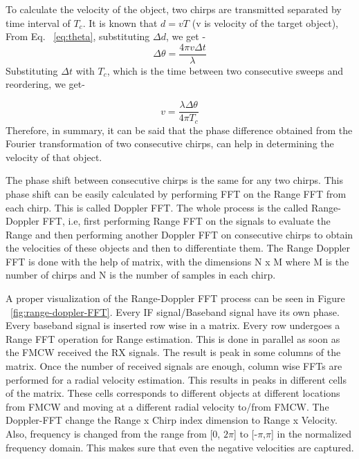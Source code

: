To calculate the velocity of the object, two chirps are transmitted separated by time interval of $T_{c}$.
It is known that $d= vT$ (v is velocity of the target object), From Eq. ~\ref{eq:theta}, substituting $\Delta d$, we get -
\begin{equation}
    \Delta\theta= \frac{4\pi v \Delta t}{\lambda}
\end{equation}
Substituting $\Delta t$ with $T_{c}$, which is the time between two consecutive sweeps and reordering, we get-

\begin{equation}
    v= \frac{\lambda \Delta\theta}{4\pi T_{c}}
\end{equation}
Therefore, in summary, it can be said that the phase difference obtained from the Fourier transformation of two consecutive chirps, can help in determining the velocity of that object. 

The phase shift between consecutive chirps is the same for any two chirps. This phase shift can be easily calculated by performing FFT on the Range FFT from each chirp. This is called Doppler FFT. The whole process is the called Range-Doppler FFT, i.e, first performing Range FFT on the signals to evaluate the Range and then performing another Doppler FFT on consecutive chirps to obtain the velocities of these objects and then to differentiate them. 
The Range Doppler FFT is done with the help of matrix, with the dimensions N x M where M is the number of chirps and N is the number of samples in each chirp.

A proper visualization of the Range-Doppler FFT process can be seen in Figure ~\ref{fig:range-doppler-FFT}. Every IF signal/Baseband signal have its own phase. Every baseband signal is inserted row wise in a matrix. Every row undergoes a Range FFT operation for Range estimation. This is done in parallel as soon as the FMCW received the RX signals. The result is peak in some columns of the matrix. Once the number of received signals are enough, column wise FFTs are performed for a radial velocity estimation. This results in peaks in different cells of the matrix. These cells corresponds to different objects at different locations from FMCW and moving at a different radial velocity to/from FMCW. The Doppler-FFT change the Range x Chirp index dimension to Range x Velocity. Also, frequency is changed from the range from [0, $2\pi$] to [-$\pi$,$\pi$] in the normalized frequency domain. This makes sure that even the negative velocities are captured.



